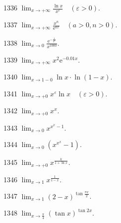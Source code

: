 \begin{prob}[S]{1336}
$\lim_{x \to +\infty} \frac{\ln x}{x^\varepsilon} \quad (\varepsilon > 0)$.
\end{prob}

\begin{prob}[S]{1337}
$\lim_{x \to +\infty} \frac{x^n}{\mathrm{e}^{ax}} \quad (a > 0, n > 0)$.
\end{prob}

\begin{prob}[S]{1338}
$\lim_{x \to 0} \frac{\mathrm{e}^{-\frac{1}{x^2}}}{x^{1000}}$.
\end{prob}

\begin{prob}[S]{1339}
$\lim_{x \to +\infty} x^2 \mathrm{e}^{-0.01x}$.
\end{prob}

\begin{prob}[S]{1340}
$\lim_{x \to 1-0} \ln x \cdot \ln(1 - x)$.
\end{prob}

\begin{prob}[S]{1341}
$\lim_{x \to +0} x^\varepsilon \ln x \quad (\varepsilon > 0)$.
\end{prob}

\begin{prob}[S]{1342}
$\lim_{x \to +0} x^x$.
\end{prob}

\begin{prob}[S]{1343}
$\lim_{x \to 0} x^{x^x - 1}$.
\end{prob}

\begin{prob}[S]{1344}
$\lim_{x \to 0} \left( x^{x^x} - 1 \right)$.
\end{prob}

\begin{prob}[S]{1345}
$\lim_{x \to +0} x^{\frac{k}{1 + \ln x}}$.
\end{prob}

\begin{prob}[S]{1346}
$\lim_{x \to 1} x^{\frac{1}{1 - x}}$.
\end{prob}

\begin{prob}[S]{1347}
$\lim_{x \to 1} (2 - x)^{\tan\frac{\pi x}{2}}$.
\end{prob}

\begin{prob}[S]{1348}
$\lim_{x \to \frac{\pi}{4}} (\tan x)^{\tan 2x}$.
\end{prob}

